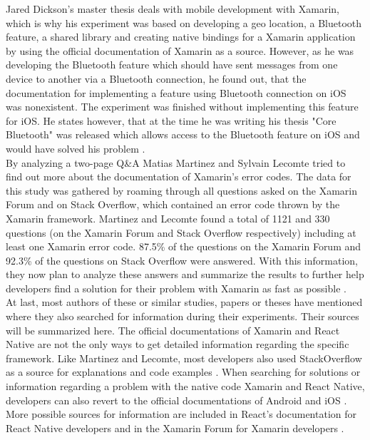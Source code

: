 \documentclass[Bachelor,BIF,english]{twbook}
\begin{document}
Jared Dickson’s master thesis deals with mobile development with Xamarin, which is why his experiment was based on developing a geo location, a Bluetooth feature, a shared library and creating native bindings for a Xamarin application by using the official documentation of Xamarin \cite{XamarinDoc} as a source. However, as he was developing the Bluetooth feature which should have sent messages from one device to another via a Bluetooth connection, he found out, that the documentation for implementing a feature using Bluetooth connection on iOS was nonexistent. The experiment was finished without implementing this feature for iOS. He states however, that at the time he was writing his thesis "Core Bluetooth" was released which allows access to the Bluetooth feature on iOS and would have solved his problem \cite[p.~11]{Dickson_2013}.
\\[\baselineskip]
By analyzing a two-page Q\&A Matias Martinez and Sylvain Lecomte tried to find out more about the documentation of Xamarin's error codes. The data for this study was gathered by roaming through all questions asked on the Xamarin Forum and on Stack Overflow, which contained an error code thrown by the Xamarin framework. Martinez and Lecomte found a total of 1121 and 330 questions (on the Xamarin Forum and Stack Overflow respectively) including at least one Xamarin error code. 87.5\% of the questions on the Xamarin Forum and 92.3\% of the questions on Stack Overflow were answered. With this information, they now plan to analyze these answers and summarize the results to further help developers find a solution for their problem with Xamarin as fast as possible \cite[p.~1,~4]{MartinezLecomte2018}.
\\[\baselineskip]
At last, most authors of these or similar studies, papers or theses have mentioned where they also searched for information during their experiments. Their sources will be summarized here. The official documentations of Xamarin and React Native are not the only ways to get detailed information regarding the specific framework. Like Martinez and Lecomte, most developers also used StackOverflow as a source for explanations and code examples \cite{MartinezLecomte2018}. When searching for solutions or information regarding a problem with the native code Xamarin and React Native, developers can also revert to the official documentations of Android and iOS \cite[p.~11]{Dickson_2013}. More possible sources for information are included in React’s documentation for React Native developers \cite{ReactDoc} and in the Xamarin Forum for Xamarin developers \cite[p.~51]{Danielsson_2016} \cite{MartinezLecomte2018}.
\end{document}
